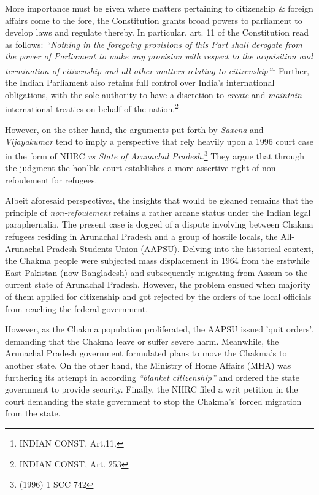 \begin{multicols}{2}
\noi
More importance must be given where matters pertaining to citizenship \& foreign affairs
come to the fore, the Constitution grants broad powers to parliament to develop laws and
regulate thereby. In particular, art. 11 of the Constitution read as follows: \textit{“Nothing in the
foregoing provisions of this Part shall derogate from the power of Parliament to make any
provision with respect to the acquisition and termination of citizenship and all other matters
relating to citizenship”}\footnote{INDIAN CONST. Art.11.} Further, the Indian Parliament also retains full control over India's
international obligations, with the sole authority to have a discretion to \textit{create} and \textit{maintain}
international treaties on behalf of the nation.\footnote{INDIAN CONST, Art. 253}

\noi
However, on the other hand, the arguments put forth by \textit{Saxena} and \textit{Vijayakumar} tend to
imply a perspective that rely heavily upon a 1996 court case in the form of NHRC \textit{vs State of
Arunachal Pradesh.}\footnote{(1996) 1 SCC 742} They argue that through the judgment the hon’ble court establishes a
more assertive right of non-refoulement for refugees.

\noi
Albeit aforesaid perspectives, the insights that would be gleaned remains that the principle of
\textit{non-refoulement} retains a rather arcane status under the Indian legal paraphernalia. The
present case is dogged of a dispute involving between Chakma refugees residing in
Arunachal Pradesh and a group of hostile locals, the All-Arunachal Pradesh Students Union
(AAPSU). Delving into the historical context, the Chakma people were subjected mass
displacement in 1964 from the erstwhile East Pakistan (now Bangladesh) and subsequently
migrating from Assam to the current state of Arunachal Pradesh. However, the problem
ensued when majority of them applied for citizenship and got rejected by the orders of the
local officials from reaching the federal government.

\noi
However, as the Chakma population proliferated, the AAPSU issued 'quit orders', demanding
that the Chakma leave or suffer severe harm. Meanwhile, the Arunachal Pradesh government
formulated plans to move the Chakma’s to another state. On the other hand, the Ministry of
Home Affairs (MHA) was furthering its attempt in according \textit{“blanket citizenship”} and
ordered the state government to provide security. Finally, the NHRC filed a writ petition in
the court demanding the state government to stop the Chakma’s' forced migration from the
state.


\end{multicols}
